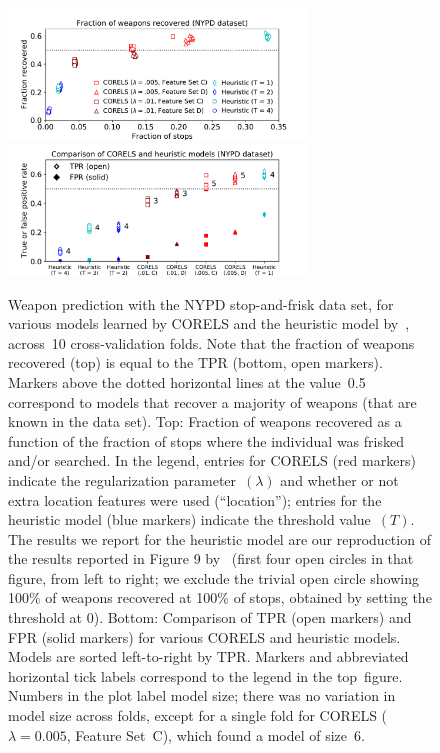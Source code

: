 \documentclass[twoside,11pt]{article}
\def\Reg{{\lambda}}
\begin{document}
\begin{figure}[t!]
\begin{center}
\includegraphics[trim={12mm, 0mm, 24mm, 5mm},
width=0.71\textwidth]{figs/cpw_folds.pdf}
\includegraphics[trim={12mm, 5mm, 24mm, 0mm},
width=0.71\textwidth]{figs/cpw_tpr_fpr.pdf}
\end{center}
\caption{Weapon prediction with the NYPD stop-and-frisk data set,
for various models learned by CORELS and the heuristic model by~\citet{Goel16},
across~10 cross-validation folds.
%
Note that the fraction of weapons recovered (top) is equal to the TPR (bottom, open markers).
%
Markers above the dotted horizontal lines at the value~0.5 correspond to models that
recover a majority of weapons (that are known in the data set).
%
Top: Fraction of weapons recovered as a function of the fraction of stops
where the individual was frisked and/or searched.
%
In the legend, entries for CORELS (red markers) indicate the regularization parameter~$(\Reg)$
and whether or not extra location features were used (``location'');
entries for the heuristic model (blue markers) indicate the threshold value~$(T)$.
%
The results we report for the heuristic model
are our reproduction of the results reported in Figure 9 by~\citet{Goel16}
(first four open circles in that figure, from left to right; we exclude the trivial open circle
showing 100\% of weapons recovered at 100\% of stops, obtained by setting the threshold at 0).
%
Bottom: Comparison of TPR (open markers) and FPR (solid markers) for various
CORELS and heuristic models.
%
Models are sorted left-to-right by TPR.
%
Markers and abbreviated horizontal tick labels correspond to the legend in the top~figure.
%
Numbers in the plot label model size; there was no variation in model size across folds,
except for a single fold for CORELS (${\Reg = 0.005}$, Feature Set~C), which found a model of size~6.
}
\label{fig:frisk}
\end{figure}
\end{document}
